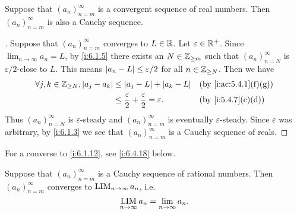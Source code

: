 \begin{prop}\label{i:6.1.12}
  Suppose that \((a_n)_{n = m}^\infty\) is a convergent sequence of real numbers.
  Then \((a_n)_{n = m}^\infty\) is also a Cauchy sequence.
\end{prop}

\begin{proof}[]
  Suppose that \((a_n)_{n = m}^\infty\) converges to \(L \in \mathbb{R}\).
  Let \(\varepsilon \in \mathbb{R}^+\).
  Since \(\lim_{n \to \infty} a_n = L\), by \cref{i:6.1.5} there exists an \(N \in \mathbb{Z}_{\geq m}\) such that \((a_n)_{n = N}^\infty\) is \(\varepsilon / 2\)-close to \(L\).
  This means \(\left\lvert a_n - L\right\rvert \leq \varepsilon / 2\) for all \(n \in \mathbb{Z}_{\geq N}\).
  Then we have
  \begin{align*}
    \forall j, k \in \Z_{\geq N}, \abs{a_j - a_k} & \leq \abs{a_j - L} + \abs{a_k - L}                                  &  & \by{i:ac:5.4.1}[f,g] \\
                                                  & \leq \dfrac{\varepsilon}{2} + \dfrac{\varepsilon}{2} = \varepsilon. &  & \by{i:5.4.7}[c,d]
  \end{align*}
  Thus \((a_n)_{n = N}^\infty\) is \(\varepsilon\)-steady and \((a_n)_{n = m}^\infty\) is eventually \(\varepsilon\)-steady.
  Since \(\varepsilon\) was arbitrary, by \cref{i:6.1.3} we see that \((a_n)_{n = m}^\infty\) is a Cauchy sequence of reals.
\end{proof}

\setcounter{thm}{13}
\begin{rmk}\label{i:6.1.14}
  For a converse to \cref{i:6.1.12}, see \cref{i:6.4.18} below.
\end{rmk}

\begin{prop}\label{i:6.1.15}
  Suppose that \((a_n)_{n = m}^\infty\) is a Cauchy sequence of rational numbers.
  Then \((a_n)_{n = m}^\infty\) converges to \(\operatorname*{LIM}_{n \to \infty} a_n\), i.e.
  \[
    \operatorname*{LIM}_{n \to \infty} a_n = \lim_{n \to \infty} a_n.
  \]
\end{prop}

